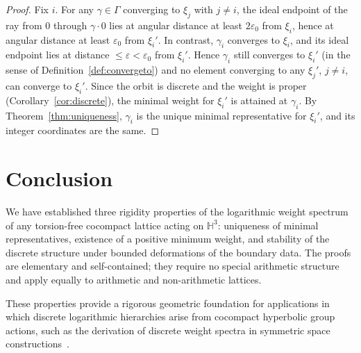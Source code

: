 \documentclass[12pt]{article}
\theoremstyle{definition}
\theoremstyle{remark}
\begin{document}
\begin{proof}
Fix $i$. For any $\gamma\in\Gamma$ converging to $\xi_j$ with $j\neq i$,
the ideal endpoint of the ray from $0$ through $\gamma\cdot0$ lies at
angular distance at least $2\varepsilon_0$ from $\xi_i$, hence at angular
distance at least $\varepsilon_0$ from $\xi_i'$.
In contrast, $\gamma_i$ converges to $\xi_i$, and its ideal endpoint lies
at distance $\le\varepsilon<\varepsilon_0$ from $\xi_i'$.
Hence $\gamma_i$ still converges to $\xi_i'$ (in the sense of
Definition~\ref{def:convergeto}) and no element converging to any
$\xi_j'$, $j\neq i$, can converge to $\xi_i'$.
Since the orbit is discrete and the weight is proper
(Corollary~\ref{cor:discrete}), the minimal weight for $\xi_i'$ is
attained at $\gamma_i$. By Theorem~\ref{thm:uniqueness}, $\gamma_i$ is
the unique minimal representative for $\xi_i'$, and its integer coordinates
are the same.
\end{proof}

\section{Conclusion}

We have established three rigidity properties of the logarithmic weight
spectrum of any torsion-free cocompact lattice acting on $\mathbb{H}^3$:
uniqueness of minimal representatives, existence of a positive minimum
weight, and stability of the discrete structure under bounded deformations
of the boundary data. The proofs are elementary and self-contained; they
require no special arithmetic structure and apply equally to arithmetic
and non-arithmetic lattices.

These properties provide a rigorous geometric foundation for applications
in which discrete logarithmic hierarchies arise from cocompact hyperbolic
group actions, such as the derivation of discrete weight spectra in
symmetric space constructions~\cite{Gentry2026masses}.



\end{document}
